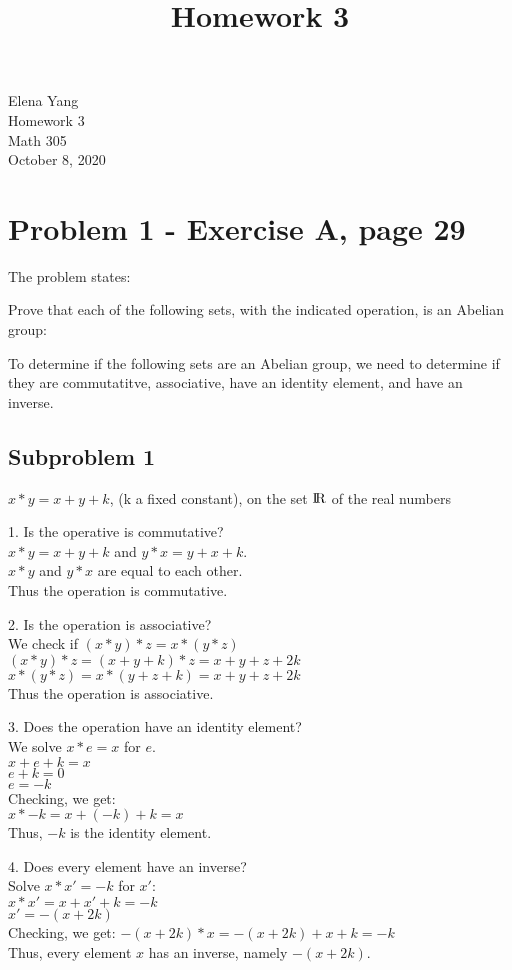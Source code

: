 \documentclass[12pt]{article}
\title{Homework 3}
\begin{document}
Elena Yang \\
Homework 3 \\
Math 305 \\
October 8, 2020

\hrulefill

\section{Problem 1 - Exercise A, page 29}
The problem states:
\begin{center}
Prove that each of the following sets, with the indicated operation, is an Abelian group:
\end{center}
To determine if the following sets are an Abelian group, we need to determine if they are commutatitve, associative, have an identity element, and have an inverse.
\subsection{Subproblem 1}
\begin{center}
$x * y = x + y + k$, (k a fixed constant), on the set ${\rm I\!R}$ of the real numbers
\end{center}
1. Is the operative is commutative?\\
$x*y=x+y+k$ and $y*x=y+x+k$. 
\\$x*y$ and $y*x$ are equal to each other. 
\\Thus the operation is commutative.

2. Is the operation is associative?\\
We check if $(x*y)*z=x*(y*z)$\\
$(x*y)*z=(x+y+k)*z=x+y+z+2k$\\
$x*(y*z)=x*(y+z+k)=x+y+z+2k$\\
Thus the operation is associative.

3. Does the operation have an identity element?\\
We solve $x*e=x$ for $e$.\\
$x+e+k=x$\\$e+k=0$\\$e=-k$\\
Checking, we get:\\
$x*-k=x+(-k)+k=x$\\
Thus, $-k$ is the identity element.

4. Does every element have an inverse?\\
Solve $x*x'=-k$ for $x'$:\\
$x*x'=x+x'+k=-k$\\
$x'=-(x+2k)$\\
Checking, we get:
$-(x+2k)*x=-(x+2k)+x+k=-k$\\
Thus, every element $x$ has an inverse, namely $-(x+2k)$.
\end{document}
